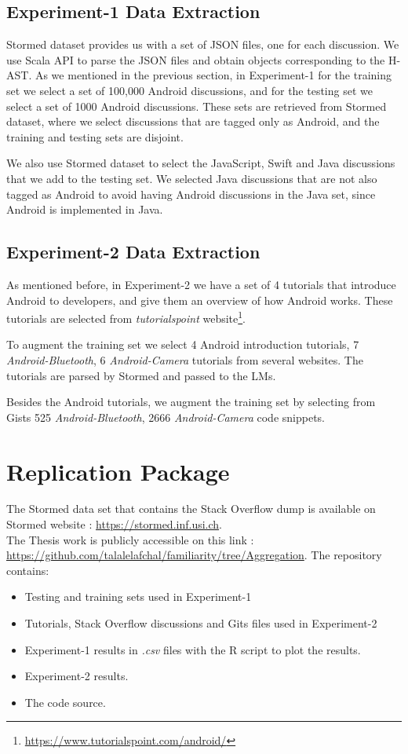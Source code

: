 \documentclass[12pt,mscthesis]{usiinfthesis}
\begin{document}
{	\subsection{Experiment-1 Data Extraction}

	Stormed dataset provides us with a set of JSON files, one for each discussion. We use Scala API to parse the JSON files and obtain objects corresponding to the H-AST.
	As we mentioned in the previous section, in Experiment-1 for the training set we select a set of 100,000 Android discussions, and for the testing set we select a set of 1000 Android discussions. These sets are retrieved from Stormed dataset, where we select discussions that are tagged only as Android, and the training and testing sets are disjoint.

	We also use Stormed dataset to select the JavaScript, Swift and Java discussions that we add to the testing set. We selected Java discussions that are not also tagged as Android to avoid having Android discussions in the Java set, since Android is implemented in Java.

	\subsection{Experiment-2 Data Extraction}
	
	As mentioned before, in Experiment-2 we have a set of 4 tutorials that introduce Android to developers, and give them an overview of how Android works. These tutorials are  selected from \emph{tutorialspoint} website\footnote{\url{https://www.tutorialspoint.com/android/}}. 

	To augment the training set we select 4 Android introduction tutorials, 7 \emph{Android-Bluetooth}, 6 \emph{Android-Camera} tutorials from several websites. The tutorials are parsed by Stormed and passed to the LMs.  

	Besides the Android tutorials, we augment the training set by selecting from Gists 525 \emph{Android-Bluetooth}, 2666 \emph{Android-Camera} code snippets.

 	\section{Replication Package}

 	The Stormed data set that contains the Stack Overflow dump is available on Stormed website : \url{https://stormed.inf.usi.ch}.\\


 	The Thesis work is publicly accessible on this link : \url{https://github.com/talalelafchal/familiarity/tree/Aggregation}. The repository contains:
 	\begin{itemize}
 	\item Testing and training sets used in Experiment-1
 	\item Tutorials, Stack Overflow discussions and Gits files used in Experiment-2
 	\item Experiment-1 results in \emph{.csv} files with the R script to plot the results.
 	\item Experiment-2 results.
 	\item The code source.
 	\end{itemize} 


}
\end{document}

